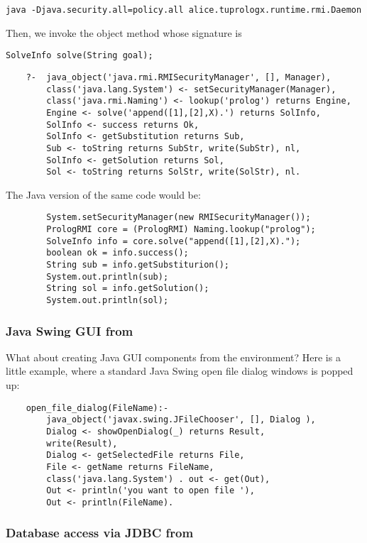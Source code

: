 {\small%
\texttt{java -Djava.security.all=policy.all  alice.tuprologx.runtime.rmi.Daemon}
}

\noindent Then, we invoke the object method whose signature is

{\small%
\texttt{SolveInfo solve(String goal);}
}
%
{\small%
\begin{verbatim}
    ?-  java_object('java.rmi.RMISecurityManager', [], Manager),
        class('java.lang.System') <- setSecurityManager(Manager),
        class('java.rmi.Naming') <- lookup('prolog') returns Engine,
        Engine <- solve('append([1],[2],X).') returns SolInfo,
        SolInfo <- success returns Ok,
        SolInfo <- getSubstitution returns Sub,
        Sub <- toString returns SubStr, write(SubStr), nl,
        SolInfo <- getSolution returns Sol,
        Sol <- toString returns SolStr, write(SolStr), nl.
\end{verbatim}
}
%
\noindent The Java version of the same code would be:
%
{\small%
\begin{verbatim}
        System.setSecurityManager(new RMISecurityManager());
        PrologRMI core = (PrologRMI) Naming.lookup("prolog");
        SolveInfo info = core.solve("append([1],[2],X).");
        boolean ok = info.success();
        String sub = info.getSubstiturion();
        System.out.println(sub);
        String sol = info.getSolution();
        System.out.println(sol);
\end{verbatim}
}


\subsubsection{Java Swing GUI from \tuprolog}

What about creating Java GUI components from the \tuprolog{}
environment?
%
Here is a little example, where a standard Java Swing open file
dialog windows is popped up:
%
{\small%
\begin{verbatim}
    open_file_dialog(FileName):-
        java_object('javax.swing.JFileChooser', [], Dialog ),
        Dialog <- showOpenDialog(_) returns Result,
        write(Result),
        Dialog <- getSelectedFile returns File,
        File <- getName returns FileName,
        class('java.lang.System') . out <- get(Out),
        Out <- println('you want to open file '),
        Out <- println(FileName).
\end{verbatim}
}

\subsubsection{Database access via JDBC from \tuprolog}

